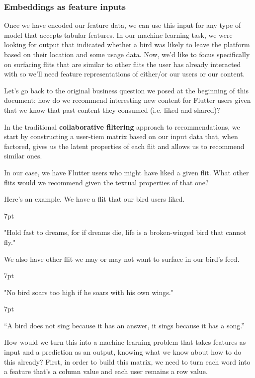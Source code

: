 \documentclass[11pt, table]{diazessay} %
\newenvironment{formal}{%
  \def\FrameCommand{%
    \hspace{1pt}%
    {\color{w_lightblue}\vrule width 2pt}%
    {\color{formalshade}\vrule width 4pt}%
    \colorbox{formalshade}%
  }%
  \MakeFramed{\advance\hsize-\width\FrameRestore}%
  \noindent\hspace{-4.55pt}%
  \begin{adjustwidth}{}{7pt}%
  \vspace{2pt}\vspace{2pt}%
}
{%
  \vspace{2pt}\end{adjustwidth}\endMakeFramed%
}
\begin{document}
\begin{sloppypar}
\subsubsection{Embeddings as feature inputs}

Once we have encoded our feature data, we can use this input for any type of model that accepts tabular features.  In our machine learning task, we were looking for output that indicated whether a bird was likely to leave the platform based on their location and some usage data. Now, we'd like to focus specifically on surfacing flits that are similar to other flits the user has already interacted with so we'll need feature representations of either/or our users or our content. 

Let's go back to the original business question we posed at the beginning of this document: how do we recommend interesting new content for Flutter users given that we know that past content they consumed (i.e. liked and shared)?

In the traditional \textbf{collaborative filtering} approach to recommendations, we start by constructing a user-tiem matrix based on our input data that, when factored, gives us the latent properties of each flit and allows us to recommend similar ones. 

In our case, we have Flutter users who might have liked a given flit. What other flits would we recommend given the textual properties of that one? 

Here’s an example.  We have a flit that our bird users liked. 

\begin{formal}
    "Hold fast to dreams, for if dreams die, life is a broken-winged bird that cannot fly."
\end{formal}

We also have other flit we may or may not want to surface in our bird's feed. 

\begin{formal}
"No bird soars too high if he soars with his own wings."
\end{formal}

\begin{formal}
“A bird does not sing because it has an answer, it sings because it has a song.” 
\end{formal}

How would we turn this into a machine learning problem that takes features as input and a prediction as an output, knowing what we know about how to do this already?  First, in order to build this matrix, we need to turn each word into a feature that's a column value and each user remains a row value. 



\end{sloppypar}
\end{document}
